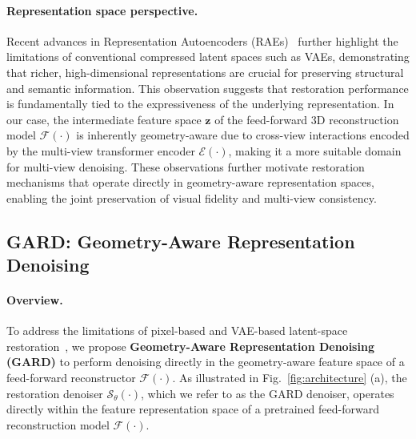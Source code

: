 \paragraph{Representation space perspective.}
Recent advances in Representation Autoencoders (RAEs)~\cite{zheng2025diffusion, tong2026scaling, kumar2026learning} further highlight the limitations of conventional compressed latent spaces such as VAEs, demonstrating that richer, high-dimensional representations are crucial for preserving structural and semantic information. This observation suggests that restoration performance is fundamentally tied to the expressiveness of the underlying representation. In our case, the intermediate feature space $\mathbf{z}$ of the feed-forward 3D reconstruction model $\mathcal{F}(\cdot)$ is inherently geometry-aware due to cross-view interactions encoded by the multi-view transformer encoder $\mathcal{E}(\cdot)$, making it a more suitable domain for multi-view denoising. These observations further motivate restoration mechanisms that operate directly in geometry-aware representation spaces, enabling the joint preservation of visual fidelity and multi-view consistency.



\subsection{GARD: Geometry-Aware Representation Denoising}
\paragraph{Overview.}
To address the limitations of pixel-based and VAE-based latent-space restoration~\cite{mao2025sir, kingma2013auto}, we propose \textbf{Geometry-Aware Representation Denoising (GARD)} to perform denoising directly in the geometry-aware feature space of a feed-forward reconstructor $\mathcal{F}(\cdot)$. 
As illustrated in Fig.~\ref{fig:architecture} (a), the restoration denoiser $\mathcal{S}_{\theta}(\cdot)$, which we refer to as the GARD denoiser, operates directly within the feature representation space of a pretrained feed-forward reconstruction model $\mathcal{F}(\cdot)$. 

